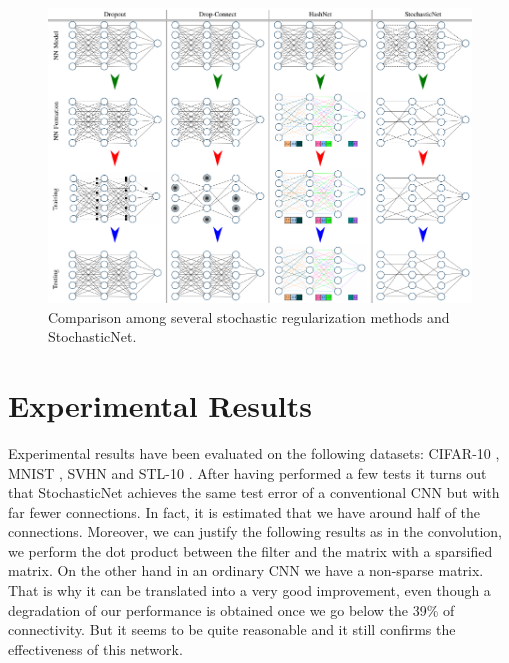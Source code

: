 \begin{figure}[h!]
    \centering
    \includegraphics[scale=0.60]{images/10_2.png}
    \caption{Comparison among several stochastic regularization methods and StochasticNet.}
    \label{fig:10_2}
\end{figure}

\FloatBarrier

\section{Experimental Results}

Experimental results have been evaluated on the following datasets: CIFAR-10 \citep{CIFAR10and100}, MNIST \citep{MNIST}, SVHN \citep{SVHN} and STL-10 \citep{STL10}. After having performed a few tests it turns out that StochasticNet achieves the same test error of a conventional CNN but with far fewer connections. In fact, it is estimated that we have around half of the connections. Moreover, we can justify the following results as in the convolution, we perform the dot product between the filter and the matrix with a sparsified matrix. On the other hand in an ordinary CNN we have a non-sparse matrix. That is why it can be translated into a very good improvement, even though a degradation of our performance is obtained once we go below the 39\% of connectivity. But it seems to be quite reasonable and it still confirms the effectiveness of this network.